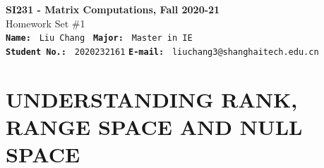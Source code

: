 \documentclass[english,onecolumn,UTF8]{IEEEtran}
\begin{document}
\begin{center}
\textbf{SI231 - Matrix Computations, Fall 2020-21} \\ Homework Set \#1\\
\texttt{\textbf{Name:}}   	\texttt{ Liu Chang }  		\hspace{1bp}
\texttt{\textbf{Major:}}  	\texttt{ Master in IE } 	\\
\texttt{\textbf{Student No.:}} 	\texttt{ 2020232161}     \hspace{1bp}
\texttt{\textbf{E-mail:}} 	\texttt{ liuchang3@shanghaitech.edu.cn}
\par\end{center}

\section{UNDERSTANDING RANK, RANGE SPACE AND NULL SPACE}
	
\end{document}
